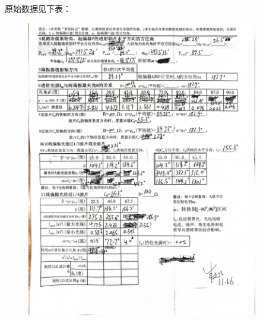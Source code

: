 \documentclass[12pt]{article}
\begin{document}
原始数据见下表：
\begin{figure}[H]
    \centering
    \includegraphics[width=0.9\textwidth]{IMG_20231125_125426.jpg}
\end{figure}
\end{document}
